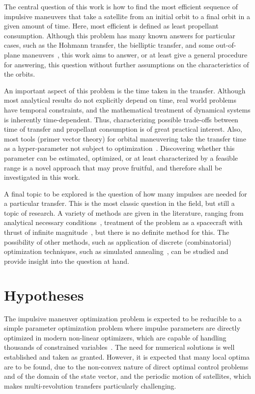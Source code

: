 The central question of this work is how to find the most efficient sequence of impulsive maneuvers that take a satellite from an initial orbit to a final orbit in a given amount of time. Here, most efficient is defined as least propellant consumption. Although this problem has many known answers for particular cases, such as the Hohmann transfer, the bielliptic transfer, and some out-of-plane maneuvers~\cite{chobotov}, this work aims to answer, or at least give a general procedure for answering, this question without further assumptions on the characteristics of the orbits.

An important aspect of this problem is the time taken in the transfer. Although most analytical results do not explicitly depend on time, real world problems have temporal constraints, and the mathematical treatment of dynamical systems is inherently time-dependent. Thus, characterizing possible trade-offs between time of transfer and propellant consumption is of great practical interest. Also, most tools (primer vector theory) for orbital maneuvering take the transfer time as a hyper-parameter not subject to optimization~\cite{Conway_2010}. Discovering whether this parameter can be estimated, optimized, or at least characterized by a feasible range is a novel approach that may prove fruitful, and therefore shall be investigated in this work.

A final topic to be explored is the question of how many impulses are needed for a particular transfer. This is the most classic question in the field, but still a topic of research. A variety of methods are given in the literature, ranging from analytical necessary conditions~\cite{interactive_primer_vector}, treatment of the problem as a spacecraft with thrust of infinite magnitude~\cite{how_many_impulses}, but there is no definite method for this. The possibility of other methods, such as application of discrete (combinatorial) optimization techniques, such as simulated annealing~\cite{numerical_recipes}, can be studied and provide insight into the question at hand.

\section{Hypotheses}

The impulsive maneuver optimization problem is expected to be reducible to a simple parameter optimization problem where impulse parameters are directly optimized in modern non-linear optimizers, which are capable of handling thousands of constrained variables~\cite{ipopt}. The need for numerical solutions is well established and taken as granted. However, it is expected that many local optima are to be found, due to the non-convex nature of direct optimal control problems and of the domain of the state vector, and the periodic motion of satellites, which makes multi-revolution transfers particularly challenging.

